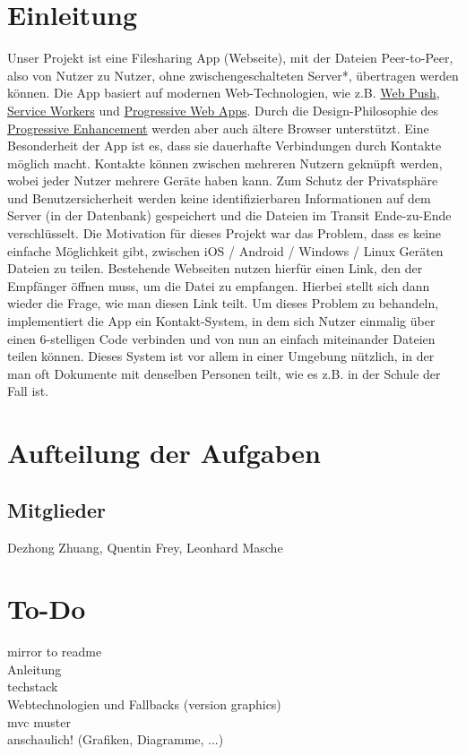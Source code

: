 \documentclass[a4paper]{article}
\begin{document}
  \setcounter{tocdepth}{1}
  \tableofcontents
  \newpage

  \section{Einleitung}
  Unser Projekt ist eine Filesharing App (Webseite), mit der Dateien Peer-to-Peer, also von Nutzer zu Nutzer, ohne zwischengeschalteten Server*, übertragen werden können.
  Die App basiert auf modernen Web-Technologien, wie z.B. \href{https://web.dev/push-notifications-web-push-protocol/}{Web Push}, \href{https://web.dev/learn/pwa/service-workers/}{Service Workers} und \href{https://web.dev/progressive-web-apps/}{Progressive Web Apps}.
  Durch die Design-Philosophie des \href{https://developer.mozilla.org/en-US/docs/Glossary/Progressive_Enhancement}{Progressive Enhancement} werden aber auch ältere Browser unterstützt. Eine Besonderheit der App ist es, dass sie dauerhafte Verbindungen durch Kontakte möglich macht. Kontakte können zwischen mehreren Nutzern geknüpft werden, wobei jeder Nutzer mehrere Geräte haben kann. Zum Schutz der Privatsphäre und Benutzersicherheit werden keine identifizierbaren Informationen auf dem Server (in der Datenbank) gespeichert und die Dateien im Transit Ende-zu-Ende verschlüsselt.
  Die Motivation für dieses Projekt war das Problem, dass es keine einfache Möglichkeit gibt, zwischen iOS / Android / Windows / Linux Geräten Dateien zu teilen. Bestehende Webseiten nutzen hierfür einen Link, den der Empfänger öffnen muss, um die Datei zu empfangen. Hierbei stellt sich dann wieder die Frage, wie man diesen Link teilt. Um dieses Problem zu behandeln, implementiert die App ein Kontakt-System, in dem sich Nutzer einmalig über einen 6-stelligen Code verbinden und von nun an einfach miteinander Dateien teilen können. Dieses System ist vor allem in einer Umgebung nützlich, in der man oft Dokumente mit denselben Personen teilt, wie es z.B. in der Schule der Fall ist.

  \section{Aufteilung der Aufgaben}

  \subsection*{Mitglieder}
  Dezhong Zhuang, Quentin Frey, Leonhard Masche

  \section{To-Do}
  mirror to readme\\
  Anleitung\\
  techstack\\
  Webtechnologien und Fallbacks (version graphics)\\
  mvc muster\\
  anschaulich! (Grafiken, Diagramme, ...)
\end{document}
